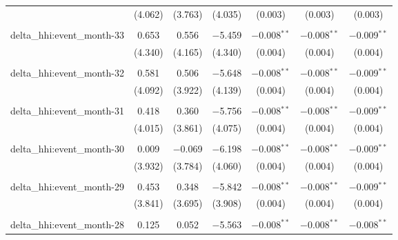 \begin{table}[H]
{\begin{tabular}{@{\extracolsep{5pt}}lcccccc}
   & (4.062) & (3.763) & (4.035) & (0.003) & (0.003) & (0.003) \\  

   & & & & & & \\  

  delta\_hhi:event\_month-33 & 0.653 & 0.556 & $-$5.459 & $-$0.008$^{**}$ & $-$0.008$^{**}$ & $-$0.009$^{**}$ \\  

   & (4.340) & (4.165) & (4.340) & (0.004) & (0.004) & (0.004) \\  

   & & & & & & \\  

  delta\_hhi:event\_month-32 & 0.581 & 0.506 & $-$5.648 & $-$0.008$^{**}$ & $-$0.008$^{**}$ & $-$0.009$^{**}$ \\  

   & (4.092) & (3.922) & (4.139) & (0.004) & (0.004) & (0.004) \\  

   & & & & & & \\  

  delta\_hhi:event\_month-31 & 0.418 & 0.360 & $-$5.756 & $-$0.008$^{**}$ & $-$0.008$^{**}$ & $-$0.009$^{**}$ \\  

   & (4.015) & (3.861) & (4.075) & (0.004) & (0.004) & (0.004) \\  

   & & & & & & \\  

  delta\_hhi:event\_month-30 & 0.009 & $-$0.069 & $-$6.198 & $-$0.008$^{**}$ & $-$0.008$^{**}$ & $-$0.009$^{**}$ \\  

   & (3.932) & (3.784) & (4.060) & (0.004) & (0.004) & (0.004) \\  

   & & & & & & \\  

  delta\_hhi:event\_month-29 & 0.453 & 0.348 & $-$5.842 & $-$0.008$^{**}$ & $-$0.008$^{**}$ & $-$0.009$^{**}$ \\  

   & (3.841) & (3.695) & (3.908) & (0.004) & (0.004) & (0.004) \\  

   & & & & & & \\  

  delta\_hhi:event\_month-28 & 0.125 & 0.052 & $-$5.563 & $-$0.008$^{**}$ & $-$0.008$^{**}$ & $-$0.008$^{**}$ \\  


\end{tabular}}
\end{table}
